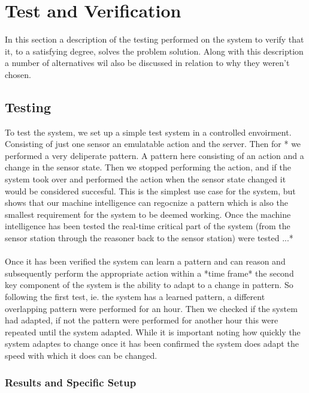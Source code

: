 \section{Test and Verification}
In this section a description of the testing performed on the system to verify that it, to a satisfying degree, solves the problem solution. Along with this description a number of alternatives wil also be discussed in relation to why they weren't chosen.

\subsection{Testing}
To test the system, we set up a simple test system in a controlled envoirment. Consisting of just one sensor an emulatable action and the server. Then for * we performed a very deliperate pattern. A pattern here consisting of an action and a change in the sensor state. Then we stopped performing the action, and if the system took over and performed the action when the sensor state changed it would be considered succesful. This is the simplest use case for the system, but shows that our machine intelligence can regocnize a pattern which is also the smallest requirement for the system to be deemed working. Once the machine intelligence has been tested the real-time critical part of the system (from the sensor station through the reasoner back to the sensor station) were tested ...*
\\\\
Once it has been verified the system can learn a pattern and can reason and subsequently perform the appropriate action within a *time frame* the second key component of the system is the ability to adapt to a change in pattern. So following the first test, ie. the system has a learned pattern, a different overlapping pattern were performed for an hour. Then we checked if the system had adapted, if not the pattern were performed for another hour this were repeated until the system adapted. While it is important noting how quickly the system adaptes to change once it has been confirmed the system does adapt the speed with which it does can be changed.
\subsubsection{Results and Specific Setup}

